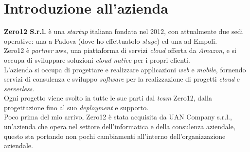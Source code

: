 \section{Introduzione all'azienda}
\label{sez:introduzione-azienda}

\textbf{Zero12 S.r.l.} è una \textit{startup} italiana fondata nel 2012, con attualmente due sedi operative: una a Padova (dove ho effettuatolo \textit{stage}) ed una ad Empoli.\\
Zero12 è \textit{partner} \gls{aws}, una piattaforma di servizi \textit{cloud} offerta da \textit{Amazon}, e si occupa di sviluppare soluzioni \textit{cloud native} per i propri clienti.\\
L'azienda si occupa di progettare e realizzare applicazioni \textit{web} e \textit{mobile}, fornendo servizi di consulenza e sviluppo \textit{software} per la realizzazione di progetti \textit{cloud} e \textit{serverless}.\\
Ogni progetto viene svolto in tutte le sue parti dal \textit{team} Zero12, dalla progettazione fino al suo \textit{deployment} e supporto.\\
Poco prima del mio arrivo, Zero12 è stata acquisita da UAN Company s.r.l., un'azienda che opera nel settore dell'informatica e della consulenza aziendale, 
questo sta portando non pochi cambiamenti all'interno dell'organizzazione aziendale.\\